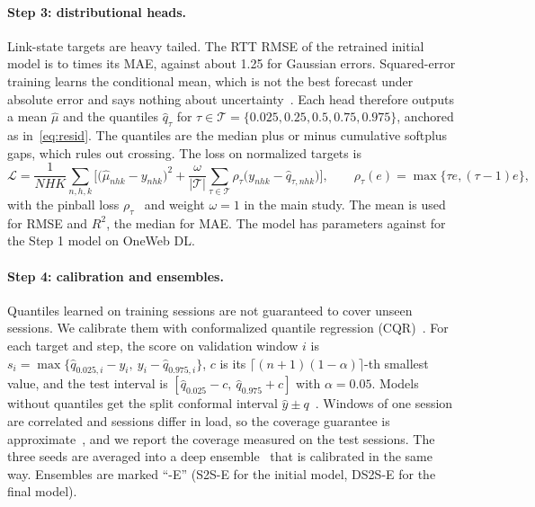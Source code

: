 \paragraph{Step 3: distributional heads.} Link-state targets are heavy tailed. The RTT RMSE of the retrained initial model is \RatioRMSEMAEMin{} to \RatioRMSEMAEMax{} times its MAE, against about 1.25 for Gaussian errors. Squared-error training learns the conditional mean, which is not the best forecast under absolute error and says nothing about uncertainty~\cite{gneiting2011making}. Each head therefore outputs a mean $\hat{\mu}$ and the quantiles $\hat{q}_\tau$ for $\tau\in\mathcal{T}=\{0.025, 0.25, 0.5, 0.75, 0.975\}$, anchored as in~\eqref{eq:resid}. The quantiles are the median plus or minus cumulative softplus gaps, which rules out crossing. The loss on normalized targets is
\begin{equation}
\mathcal{L} = \frac{1}{NHK}\sum_{n,h,k}\Big[\big(\hat{\mu}_{nhk}-y_{nhk}\big)^2 + \frac{\omega}{|\mathcal{T}|}\sum_{\tau\in\mathcal{T}}\rho_\tau\big(y_{nhk}-\hat{q}_{\tau,nhk}\big)\Big],
\qquad \rho_\tau(e)=\max\{\tau e,(\tau-1)e\},
\label{eq:loss}
\end{equation}
with the pinball loss $\rho_\tau$~\cite{koenker1978regression} and weight $\omega=1$ in the main study. The mean is used for RMSE and $R^2$, the median for MAE. The model has \ParamsDist{} parameters against \ParamsResid{} for the Step 1 model on OneWeb DL.

\paragraph{Step 4: calibration and ensembles.} Quantiles learned on training sessions are not guaranteed to cover unseen sessions. We calibrate them with conformalized quantile regression (CQR)~\cite{romano2019conformalized}. For each target and step, the score on validation window $i$ is $s_i=\max\{\hat{q}_{0.025,i}-y_i,\ y_i-\hat{q}_{0.975,i}\}$, $c$ is its $\lceil (n+1)(1-\alpha)\rceil$-th smallest value, and the test interval is $[\hat{q}_{0.025}-c,\ \hat{q}_{0.975}+c]$ with $\alpha=0.05$. Models without quantiles get the split conformal interval $\hat{y}\pm q$~\cite{lei2018distribution}. Windows of one session are correlated and sessions differ in load, so the coverage guarantee is approximate~\cite{barber2023conformal}, and we report the coverage measured on the test sessions. The three seeds are averaged into a deep ensemble~\cite{lakshminarayanan2017simple} that is calibrated in the same way. Ensembles are marked ``-E'' (S2S-E for the initial model, DS2S-E for the final model).

